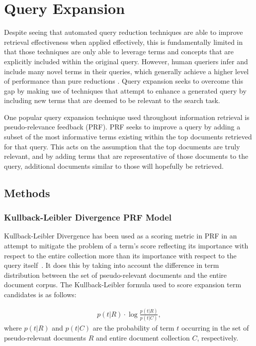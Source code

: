 \documentclass[a4paper]{report}
\begin{document}
\chapter{Query Expansion}
Despite seeing that automated query reduction techniques are able to improve retrieval effectiveness when applied effectively, this is fundamentally limited in that those techniques are only able to leverage terms and concepts that are explicitly included within the original query. However, human queriers infer and include many novel terms in their queries, which generally achieve a higher level of performance than pure reductions \citep{koopman2017generating}. Query expansion seeks to overcome this gap by making use of techniques that attempt to enhance a generated query by including new terms that are deemed to be relevant to the search task.

One popular query expansion technique used throughout information retrieval is pseudo-relevance feedback (PRF). PRF seeks to improve a query by adding a subset of the most informative terms existing within the top documents retrieved for that query. This acts on the assumption that the top documents are truly relevant, and by adding terms that are representative of those documents to the query, additional documents similar to those will hopefully be retrieved.

\section{Methods}
\subsection{Kullback-Leibler Divergence PRF Model}
Kullback-Leibler Divergence has been used as a scoring metric in PRF in an attempt to mitigate the problem of a term's score reflecting its importance with respect to the entire collection more than its importance with respect to the query itself~\citep{Carpineto:2012:SAQ:2071389.2071390}. It does this by taking into account the difference in term distribution between the set of pseudo-relevant documents and the entire document corpus. The Kullback-Leibler formula used to score expansion term candidates is as follows:

\begin{equation}
\label{kld-feedback}
\begin{split}
p(t|R) \cdot \log{\frac{p(t|R)}{p(t|C)}},
\end{split}
\end{equation}
where $p(t|R)$ and $p(t|C)$ are the probability of term $t$ occurring in the set of pseudo-relevant documents $R$ and entire document collection $C$, respectively.
\end{document}
